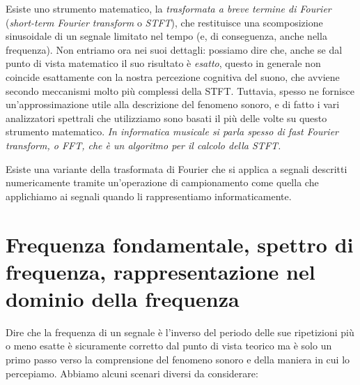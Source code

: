 \documentclass[11pt]{report}
\begin{document}
Esiste uno strumento matematico, la \emph{trasformata a breve termine di Fourier} (\emph{short-term Fourier transform} o \emph{STFT}), che restituisce una scomposizione sinusoidale di un segnale limitato nel tempo (e, di conseguenza, anche nella frequenza). Non entriamo ora nei suoi dettagli: possiamo dire che, anche se dal punto di vista matematico il suo risultato è \emph{esatto}, questo in generale non coincide esattamente con la nostra percezione cognitiva del suono, che avviene secondo meccanismi molto più complessi della STFT. Tuttavia, spesso ne fornisce un'approssimazione utile alla descrizione del fenomeno sonoro, e di fatto i vari analizzatori spettrali che utilizziamo sono basati il più delle volte su questo strumento matematico.%
\emph{In informatica musicale si parla spesso di \emph{fast Fourier transform}, o \emph{FFT}, che è un algoritmo per il calcolo della STFT.}





Esiste una variante della trasformata di Fourier che si applica a segnali descritti numericamente tramite un'operazione di campionamento come quella che applichiamo ai segnali quando li rappresentiamo informaticamente. 










\section{Frequenza fondamentale, spettro di frequenza, rappresentazione nel dominio della frequenza}










Dire che la frequenza di un segnale è l'inverso del periodo delle sue ripetizioni più o meno esatte è sicuramente corretto dal punto di vista teorico ma è solo un primo passo verso la comprensione del fenomeno sonoro e della maniera in cui lo percepiamo. Abbiamo alcuni scenari diversi da considerare:
\end{document}
